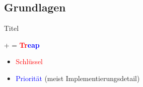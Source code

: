 \documentclass[t]{beamer}
\theoremstyle{plain}
\begin{document}
\subsection{Grundlagen}
\begin{frame}{Titel}
    \begin{center}
         +  = \textbf{\textcolor{red}{Tr}\textcolor{blue}{eap}}
    \end{center}
    \begin{itemize}
        \item<2-> \textcolor{red}{Schlüssel}
        \item<3-> \textcolor{blue}{Priorität} (meist Implementierungsdetail)
    \end{itemize}
    \vspace{1em}
    \hfill{}
\end{frame}
\end{document}
